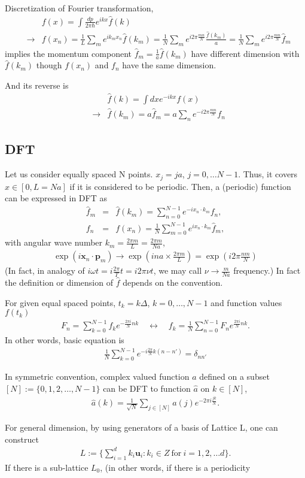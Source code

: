 \documentclass[10pt]{book}
\def\bm{\boldsymbol}
\newcommand{\bea}{\begin{eqnarray}}
\newcommand{\eea}{\end{eqnarray}}
\newcommand{\no}{\nonumber \\}
\def\vp{{\bm p}}
\def\vx{{\bm x}}
\begin{document}
Discretization of Fourier transformation,
\bea 
& &f(x)=\int \frac{dp}{2\pi \hbar} e^{i k x} \hat{f}(k) \no 
&\to& f(x_n)=\frac{1}{L} \sum_{m} e^{i k_m x_n} \hat{f}(k_m) 
      =\frac{1}{N} \sum_{m} e^{i 2\pi \frac{mn}{N}} \frac{\hat{f}(k_m)}{a}
      =\frac{1}{N}\sum_{m} e^{i 2\pi \frac{mn}{N}} \hat{f}_m
\eea 
implies the momentum component $\hat{f}_m=\frac{1}{a}\hat{f}(k_m)$ 
have different dimension with $\hat{f}(k_m)$ though 
$f(x_n)$ and $f_n$ have the same dimension.    

And its reverse is 
\bea 
& &\hat{f}(k)=\int dx e^{-ikx} f(x) \no 
&\to& \hat{f}(k_m)= a \hat{f}_m= a\sum_{n} e^{-i 2\pi \frac{mn}{N}} f_n 
\eea 

\subsection{DFT}
Let us consider equally spaced N points. $x_j= j a$, $j=0,\dots N-1$.
Thus, it covers $x\in [0, L=N a]$ if it is considered to be periodic. 
Then, a (periodic) function can be expressed in DFT as
\bea 
\hat{f}_m&=& \hat{f}(k_m)=\sum_{n=0}^{N-1} e^{- i{x_n\cdot k_m}} {f}_n,\no 
f_n&=&f(x_n)=\frac{1}{N} \sum_{m=0}^{N-1} e^{i{x_n\cdot k_m}} \hat{f}_m,
\eea 
with angular wave number $k_m=\frac{2\pi m}{L}=\frac{2\pi m}{N a}$, 
\bea 
\exp(i\vx_n\cdot\vp_m)\to \exp\left(i n a\times \frac{2\pi m}{L}\right)
                     =\exp\left(i 2\pi \frac{n m}{N}\right) 
\eea 
(In fact, in analogy of $i\omega t=i \frac{2\pi}{T} t=i 2\pi \nu t$,
 we may call $\nu\to \frac{m}{N a}$ frequency.)  
In fact the definition or dimension of $\hat{f}$ depends on the convention. 




For given equal spaced points, $t_k=k\Delta$, $k=0,\dots,N-1$ and function values $f(t_k)$
\bea 
F_n=\sum_{k=0}^{N-1} f_k e^{-\frac{2\pi i}{N}n k}\quad \leftrightarrow \quad 
f_k=\frac{1}{N}\sum_{n=0}^{N-1} F_n e^{\frac{2\pi i}{N} n k}.
\eea 
In other words, basic equation is 
\bea 
\frac{1}{N}\sum_{k=0}^{N-1}e^{-i\frac{2\pi}{N}k(n-n')}=\delta_{nn'}
\eea 

In symmetric convention, complex valued function $a$ defined on a subset $[N]:=\{0,1,2,\dots,N-1\}$ 
can be DFT to function $\hat{a}$ on $k \in [N]$,
\bea 
\hat{a}(k)=\frac{1}{\sqrt{N}}\sum_{j\in[N]} a(j) e^{-2\pi i \frac{jk}{N}}.
\eea 

For general dimension, by using generators of a basis of Lattice L, one can construct 
\bea 
L:=\Big\{  \sum_{i=1}^d k_i {\bm u}_i :k_i \in Z\ \mbox{for}\ i=1,2,\dots d \Big\}.
\eea 
If there is a sub-lattice $L_0$, (in other words, if there is a periodicity 
\end{document}
